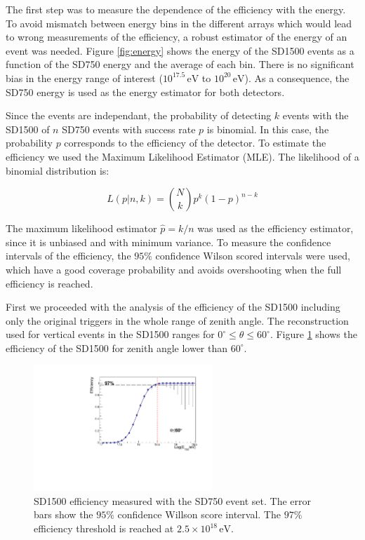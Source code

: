 \documentclass[12pt,a4paper]{article}
\newcommand{\eV}{\, \mathrm{eV}}
\begin{document}
The first step was to measure the dependence of the efficiency with the energy. To avoid mismatch between energy bins in the different arrays which would lead to wrong measurements of the efficiency, a robust estimator of the energy of an event was needed. Figure \ref{fig:energy} shows the energy of the SD1500 events as a function of the SD750 energy and the average of each bin. There is no significant bias in the energy range of interest ($10^{17.5}\eV$ to $10^{20}\eV$). As a consequence, the SD750 energy is used as the energy estimator for both detectors.

Since the events are independant, the probability of detecting $k$ events with the SD1500 of $n$ SD750 events with success rate $p$ is binomial. In this case, the probability $p$ corresponds to the efficiency of the detector. To estimate the efficiency we used the Maximum Likelihood Estimator (MLE). The likelihood of a binomial distribution is:

\begin{equation}
L(p|n,k)=\binom{N}{k}p^k(1-p)^{n-k}
\label{eqn:Binomial}
\end{equation}

The maximum likelihood estimator $\hat{p}=k/n$ was used as the efficiency estimator, since it is unbiased and with minimum variance. To measure the confidence intervals of the efficiency, the $95\%$ confidence Wilson scored intervals were used, which have a good coverage probability and avoids overshooting when the full efficiency is reached.

First we proceeded with the analysis of the efficiency of the SD1500 including only the original triggers in the whole range of zenith angle. The reconstruction used for vertical events in the SD1500 ranges for $0^{\circ}\leq\theta\leq60^{\circ}$.  Figure \ref{fig:allZenith} shows the efficiency of the SD1500 for zenith angle lower than $60^{\circ}$. 

\begin{figure}[h!]
    \begin{center}
        \includegraphics[width=0.6\textwidth]{plots/allZenith.pdf}  
        \caption{SD1500 efficiency measured with the SD750 event set. The error bars show the $95\%$ confidence Willson score interval. The $97\%$ efficiency threshold is reached at $2.5\times10^{18}\eV$.
        \label{fig:allZenith}}
        \vspace{-0.5cm}
    \end{center}
\end{figure}
\end{document}
